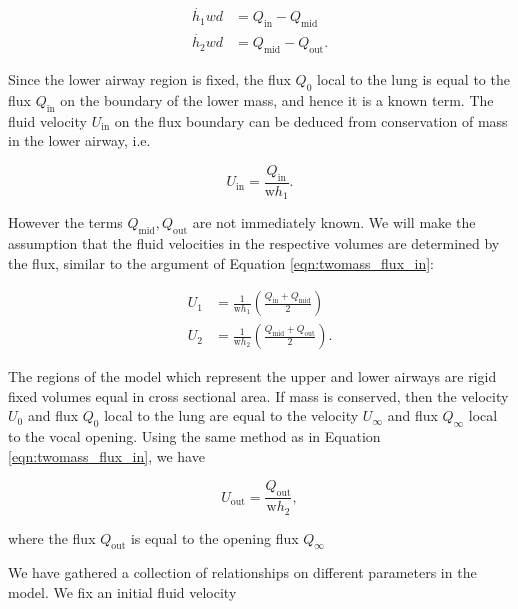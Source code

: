 \documentclass{article}
\begin{document}
\begin{equation}
    \begin{aligned}
        \dot{h_1} w d &= Q_\mathrm{in} - Q_\mathrm{mid} \\
        \dot{h_2} w d &= Q_\mathrm{mid} - Q_\mathrm{out}.
    \end{aligned}
    \label{eqn:twomass_flux_motion}
\end{equation}

Since the lower airway region is fixed,
the flux $Q_0$ local to the lung is equal to the flux $Q_\mathrm{in}$ on the boundary of the lower mass,
and hence it is a known term. The fluid velocity $U_\mathrm{in}$ on the flux boundary can be deduced from conservation of mass in the lower airway, i.e.

\begin{equation}
    U_\mathrm{in} = \frac{Q_\mathrm{in}}{\mathrm{w}h_1}.
    \label{eqn:twomass_flux_in}
\end{equation}

However the terms $Q_\mathrm{mid}, Q_\mathrm{out}$ are not immediately known.
We will make the assumption that the fluid velocities in the respective volumes are determined by the flux,
similar to the argument of Equation \ref{eqn:twomass_flux_in}:

\begin{equation}
    \begin{aligned}
        U_1 &= \frac{1}{\mathrm{w}h_1}\left(\frac{Q_\mathrm{in} + Q_\mathrm{mid}}{2}\right) \\
        U_2 &= \frac{1}{\mathrm{w}h_2}\left(\frac{Q_\mathrm{mid} + Q_\mathrm{out}}{2}\right).
        \label{eqn:twomass_velocity_interpolation}
    \end{aligned}
\end{equation}


The regions of the model which represent the upper and lower airways are rigid fixed volumes equal in cross sectional area.
If mass is conserved, then the velocity $U_0$ and flux $Q_0$ local to the lung are equal to the velocity $U_\infty$ and flux $Q_\infty$ local to the vocal opening.
Using the same method as in Equation \ref{eqn:twomass_flux_in}, we have

\begin{equation}
    U_\mathrm{out} = \frac{Q_\mathrm{out}}{\mathrm{w}h_2},
    \label{eqn:twomass_flux_out}
\end{equation}

where the flux $Q_\mathrm{out}$ is equal to the opening flux $Q_\mathrm{\infty}$

We have gathered a collection of relationships on different parameters in the model.
We fix an initial fluid velocity
\end{document}
